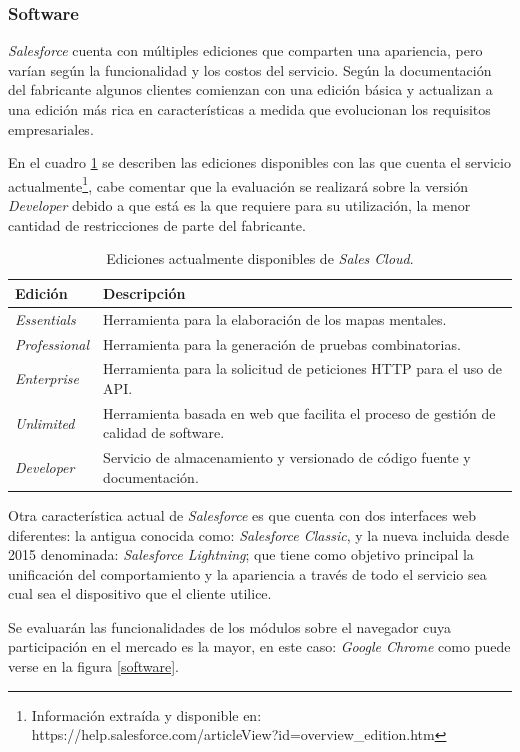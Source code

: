 \subsubsection{Software}
\emph{Salesforce} cuenta con múltiples ediciones que comparten una apariencia,
pero varían según la funcionalidad y los costos del servicio. Según la
documentación del fabricante algunos clientes comienzan con una edición básica y
actualizan a una edición más rica en características a medida que evolucionan
los requisitos empresariales.

En el cuadro \ref{ediciones} se describen las ediciones disponibles con las que
cuenta el servicio actualmente\footnote{Información extraída y disponible en:
https://help.salesforce.com/articleView?id=overview\_edition.htm}, cabe comentar
que la evaluación se realizará sobre la versión \emph{Developer} debido a que
está es la que requiere para su utilización, la menor cantidad de restricciones
de parte del fabricante.

\begin{table}
\centering
\begin{tabular}{|l|p{9.0cm}|}
\hline
\textbf{Edición} & \textbf{Descripción} \\
\hline
\emph{Essentials} & Herramienta para la elaboración de los mapas mentales. \\
\emph{Professional} & Herramienta para la generación de pruebas combinatorias. \\
\emph{Enterprise} & Herramienta para la solicitud de peticiones HTTP para el uso de API.\\
\emph{Unlimited} & Herramienta basada en web que facilita el proceso de gestión de calidad de software. \\
\emph{Developer} & Servicio de almacenamiento y versionado de código fuente y documentación. \\
\hline
\end{tabular}
\caption{Ediciones actualmente disponibles de \emph{Sales Cloud}.}
\label{ediciones}
\end{table}

Otra característica actual de \emph{Salesforce} es que cuenta con dos interfaces
web diferentes: la antigua conocida como: \emph{Salesforce Classic}, y la nueva
incluida desde 2015 denominada: \emph{Salesforce Lightning}; que tiene como
objetivo principal la unificación del comportamiento y la apariencia a través de
todo el servicio sea cual sea el dispositivo que el cliente
utilice\cite{McCarthy}.

Se evaluarán las funcionalidades de los módulos sobre el navegador cuya
participación en el mercado es la mayor, en este caso: \emph{Google Chrome}
como puede verse en la figura \ref{software}.

